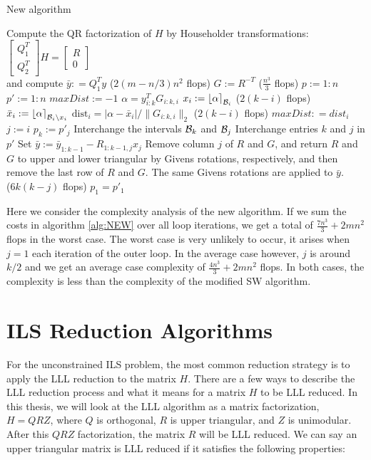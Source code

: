 \documentclass[12pt,Bold,letterpaper]{mcgilletdclass}
\newcommand{\bsmx}{\left[\begin{smallmatrix}}
\newcommand{\esmx}{\end{smallmatrix}\right]}
\newcommand{\dist}{\mathrm{dist}}
\newcommand{\vsp}{\vspace{\baselineskip}}
\begin{document}
\begin{algorithm}
\caption{New algorithm}
\label{alg:NEW}
\begin{algorithmic}[1]
\STATE  Compute the QR factorization of $H$ by Householder transformations: 
$\bsmx Q_1^T \\ Q_2^T \esmx H= \bsmx R\\ 0 \esmx$  \\
             and compute  $\bar{y} : = Q_1^Ty$ \hfill ($2(m-n/3)n^2$ flops)
\STATE $G := R^{-T}$ \hfill ($\frac{n^3}{3}$ flops)
\STATE $p := 1:n$
\STATE $p' := 1:n$
	\STATE $maxDist := -1$
	         \STATE $\alpha=y_{i:k}^TG_{i:k,i}$
	         \STATE $x_i := \left \lfloor \alpha \right \rceil_{{\cal B}_i}$ \hfill ($2(k-i)$ flops)
	         \STATE $\bar{x}_i := \left \lfloor \alpha \right \rceil_{{{\cal B}_i}\backslash x_i}$
	         \STATE $\dist_i =|\alpha-\bar{x}_i|/ \| G_{i:k,i} \|_2$ \hfill ($2(k-i)$ flops)
			 	\STATE $maxDist : = dist_i$
			 	\STATE $j:=i$
			 \ENDIF	
	\ENDFOR
	\STATE $p_k := p'_j$
	\STATE Interchange the intervals ${{\cal B}_k}$ and ${{\cal B}_j}$
	\STATE Interchange entries $k$ and $j$ in $p'$
	\STATE Set $\bar{y}:=\bar{y}_{1:k-1} - R_{1:k-1,j}x_j$	
	\STATE Remove column $j$ of $R$ and $G$, and return $R$ and $G$ to upper and lower triangular by Givens rotations, respectively, and then remove the last row of $R$ and $G$. The same Givens rotations are applied to $\bar{y}$. \\ \hfill ($6k(k-j)$ flops)
\ENDFOR
\STATE $p_1 = p'_1$
\end{algorithmic}
\end{algorithm}

Here we consider the complexity analysis of the new algorithm. 
If we sum the costs in algorithm \ref{alg:NEW} over all loop iterations,
we get a total of $\frac{7n^3}{3} + 2mn^2$ flops in the worst case. 
The worst case is very unlikely to occur, it arises when $j=1$ each iteration of the outer loop. In the average case
however, $j$ is around $k/2$ and we get an average case complexity of $\frac{4n^3}{3} + 2mn^2$ flops.
In both cases, the complexity is less than the complexity of the modified SW algorithm.

\vsp \section{ILS Reduction Algorithms}
For the unconstrained ILS problem, the most common reduction strategy is to apply the LLL reduction \cite{LenLL82} to the matrix $H$. There are a few ways to describe the LLL reduction process and what it means for a matrix $H$ to be LLL reduced. In this thesis, we will look at the LLL algorithm as a matrix factorization, $H = QRZ$, where $Q$ is orthogonal, $R$ is upper triangular, and $Z$ is unimodular. After this $QRZ$ factorization, the matrix $R$ will be LLL reduced. We can say an upper triangular matrix is LLL reduced if it satisfies the following properties:
\end{document}

